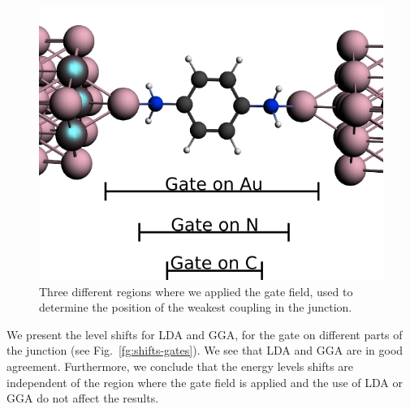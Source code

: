 \documentclass[aip,jcp,a4paper,reprint,floatfix,superscriptaddress]{revtex4-1}
\begin{document}
\begin{figure}
\includegraphics[width=0.85\columnwidth]{img.exp/BDA-Levels/gates.png} 
\caption{Three different regions where we applied the gate field, used to determine the position of the weakest coupling in the junction.}\label{fg:gates-BDA}
\end{figure}

We present the level shifts for LDA and GGA, for the gate on different parts of the junction (see Fig.~\ref{fg:shifts-gates}). We see that LDA and GGA are in good agreement. Furthermore, we conclude that the energy levels shifts are independent of the region where the gate field is applied and the use of LDA or GGA do not affect the results. 
\end{document}
